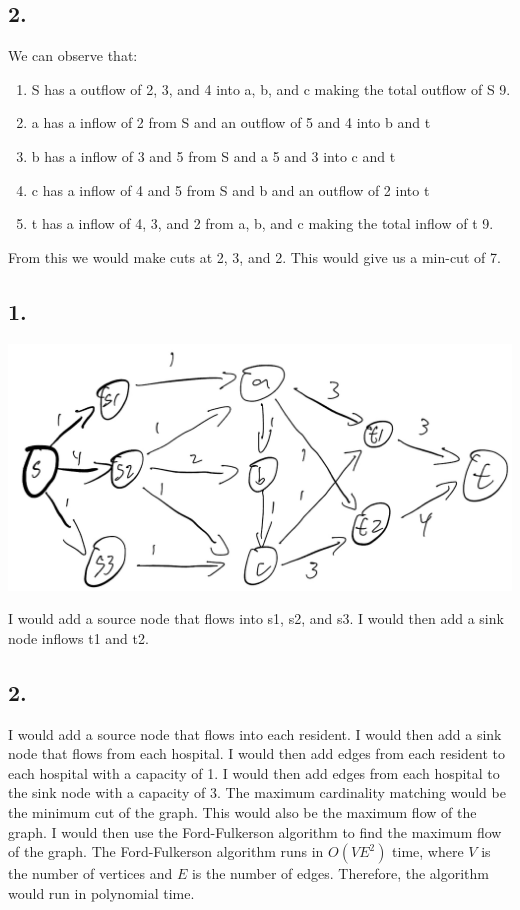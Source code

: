 \documentclass[12pt,letterpaper]{article}
\begin{document}
\subsection*{2.}
We can observe that:
\begin{enumerate}
  \item S has a outflow of 2, 3, and 4 into a, b, and c making the total outflow of S 9.
  \item a has a inflow of 2 from S and an outflow of 5 and 4 into b and t
  \item b has a inflow of 3 and 5 from S and a 5 and 3 into c and t
  \item c has a inflow of 4 and 5 from S and b and an outflow of 2 into t
  \item t has a inflow of 4, 3, and 2 from a, b, and c making the total inflow of t 9.
\end{enumerate}
From this we would make cuts at 2, 3, and 2. This would give us a min-cut of 7.

\subsection*{1.}
\begin{center}
  \includegraphics[scale = .35]{./images/3.1.jpeg}
\end{center}
I would add a source node that flows into s1, s2, and s3. I would then add
a sink node inflows t1 and t2.

\subsection*{2.}
I would add a source node that flows into each resident. I would then add a sink node
that flows from each hospital. I would then add edges from each resident to each hospital
with a capacity of 1. I would then add edges from each hospital to the sink node with a
capacity of 3. The maximum cardinality matching would be the minimum cut of the graph.
This would also be the maximum flow of the graph. 
I would then use the Ford-Fulkerson algorithm to find the maximum flow of the graph. 
The Ford-Fulkerson algorithm runs in $O(VE^2)$ time, where $V$ is the number of vertices
and $E$ is the number of edges. Therefore, the algorithm would run in polynomial time.
\end{document}
